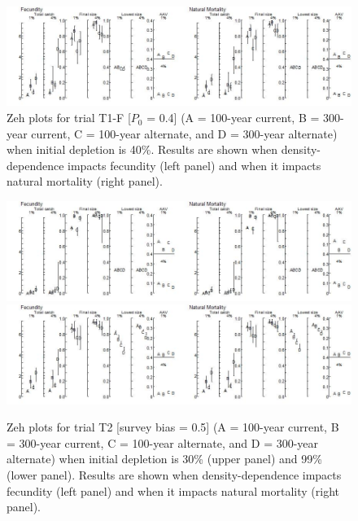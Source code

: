 \documentclass{article}\usepackage[]{graphicx}\usepackage[]{color}
\providecommand\phantomsection{}
\begin{document}
\begin{landscape}
\begin{figure}[H]
\centering
\includegraphics[]{SC66aRMP10_Part2_T1-cD.jpeg}
\caption{
Zeh plots for trial T1-F
[$P_0 $ = 0.4]
(A = 100-year current, B = 300-year current, C = 100-year alternate, and D = 300-year alternate)
when initial depletion is 40\%.
Results are shown when density-dependence impacts fecundity (left panel) and when it impacts natural mortality (right panel).
}
\end{figure}

\phantomsection
{}
\setcounter{figure}{0}


\begin{figure}[H]
\centering
\includegraphics[]{SC66aRMP10_Part2_T2-R.jpeg}
\includegraphics[]{SC66aRMP10_Part2_T2-D.jpeg}
\caption{
Zeh plots for trial T2
[survey bias = 0.5]
(A = 100-year current, B = 300-year current, C = 100-year alternate, and D = 300-year alternate)
when initial depletion is 30\% (upper panel) and 99\% (lower panel).
Results are shown when density-dependence impacts fecundity (left panel) and when it impacts natural mortality (right panel).
}
\end{figure}


\end{landscape}
\end{document}
